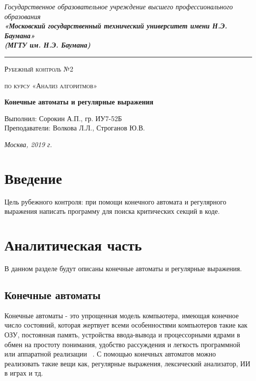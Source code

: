 \documentclass[12pt, a4paper]{report}
\begin{document}
    \begin{titlepage}

        \begin{center}
            \Large
            {\sl Государственное образовательное учреждение высшего профессионального образования\\
            {\bf«Московский государственный технический университет имени Н.Э. Баумана»\\
				(МГТУ им. Н.Э. Баумана)}}
				\noindent\rule{\textwidth}{2pt}
            \vspace{3cm}

			{\scshape\LARGE Рубежный контроль №2 \par}
			\vspace{0.5cm}	
			{\scshape\LARGE по курсу «Анализ алгоритмов» \par}
			\vspace{1.5cm}
			{\huge\bfseries Конечные автоматы и регулярные выражения \par}
			\vspace{2cm}
			\Large Выполнил: Сорокин А.П., гр. ИУ7-52Б\\
			\vspace{0.5cm}
			{\Large Преподаватели: Волкова Л.Л., Строганов Ю.В.}
		
			\vfill
			\Large \textit {Москва, 2019 г.}
            
        \end{center}

    \end{titlepage}
	
	\tableofcontents

	\chapter*{Введение}
	\hspace{0.5cm}Цель рубежного контроля: при помощи конечного автомата и регулярного выражения
	написать программу для поиска критических секций в коде.

    \chapter{Аналитическая часть}
	\hspace{0.5cm}В данном разделе будут описаны конечные автоматы и регулярные выражения.
	
	\section{Конечные автоматы}
	\hspace{0.5cm}Конечные автоматы - это упрощенная модель компьютера, имеющая конечное
	число состояний, которая жертвует всеми особенностями компьютеров такие как ОЗУ,
	постоянная память, устройства ввода-вывода и процессорными ядрами в обмен на простоту
	понимания, удобство рассуждения и легкость программной или аппаратной реализации ~\cite{ka}.
	С помощью конечных автоматов можно реализовать такие вещи как, регулярные выражения, лексический анализатор, ИИ в играх и тд.
\end{document}
